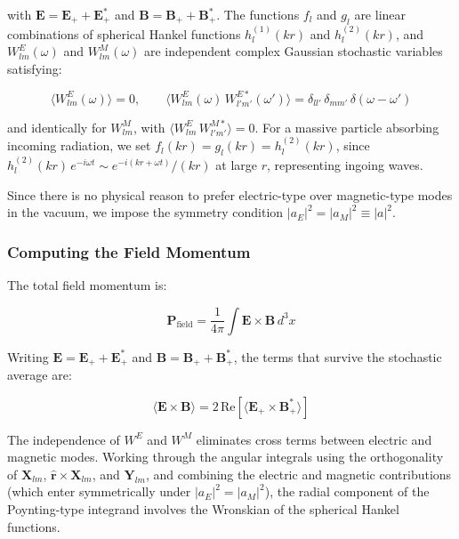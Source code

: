 \documentclass {article}
\renewcommand\vec{\mathbf}
\let\OldHat\hat
\renewcommand{\hat}[1]{\OldHat{\mathbf{#1}}}
\begin{document}
\noindent with $\vec{E} = \vec{E}_+ + \vec{E}_+^*$ and $\vec{B} = \vec{B}_+ + \vec{B}_+^*$. The functions $f_l$ and $g_l$ are linear combinations of spherical Hankel functions $h_l^{(1)}(kr)$ and $h_l^{(2)}(kr)$, and $W_{lm}^E(\omega)$ and $W_{lm}^M(\omega)$ are independent complex Gaussian stochastic variables satisfying:

\begin{equation}
\langle W_{lm}^E(\omega) \rangle = 0, \qquad
\langle W_{lm}^E(\omega)\, W_{l'm'}^{E*}(\omega') \rangle = \delta_{ll'}\, \delta_{mm'}\, \delta(\omega - \omega')
\end{equation}

\noindent and identically for $W_{lm}^M$, with $\langle W_{lm}^E\, W_{l'm'}^{M*} \rangle = 0$. For a massive particle absorbing incoming radiation, we set $f_l(kr) = g_l(kr) = h_l^{(2)}(kr)$, since $h_l^{(2)}(kr)\, e^{-i\omega t} \sim e^{-i(kr + \omega t)}/(kr)$ at large $r$, representing ingoing waves.

Since there is no physical reason to prefer electric-type over magnetic-type modes in the vacuum, we impose the symmetry condition $|a_E|^2 = |a_M|^2 \equiv |a|^2$.

\subsubsection{Computing the Field Momentum}

The total field momentum is:

\begin{equation}
\vec{P}_{\text{field}} = \frac{1}{4\pi} \int \vec{E} \times \vec{B} \, d^3x
\end{equation}

\noindent Writing $\vec{E} = \vec{E}_+ + \vec{E}_+^*$ and $\vec{B} = \vec{B}_+ + \vec{B}_+^*$, the terms that survive the stochastic average are:

\begin{equation}
\langle \vec{E} \times \vec{B} \rangle = 2\,\text{Re}\left[\langle \vec{E}_+ \times \vec{B}_+^* \rangle\right]
\end{equation}

\noindent The independence of $W^E$ and $W^M$ eliminates cross terms between electric and magnetic modes. Working through the angular integrals using the orthogonality of $\vec{X}_{lm}$, $\hat{r} \times \vec{X}_{lm}$, and $\vec{Y}_{lm}$, and combining the electric and magnetic contributions (which enter symmetrically under $|a_E|^2 = |a_M|^2$), the radial component of the Poynting-type integrand involves the Wronskian of the spherical Hankel functions.
\end{document}
